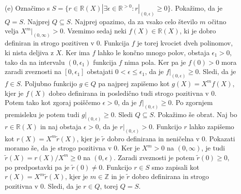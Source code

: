 \documentclass[a4paper, 12pt]{article}
\newcommand{\Z}{\mathbb{Z}}
\newcommand{\R}{\mathbb{R}}
\begin{document}
\begin{enumerate}
%
%
%
%
%


\item[(e)] Označimo s $S= \{r\in \R(X)| \exists \epsilon  \in \R^{>0} : r|_{(0,\epsilon)} \ge 0\}$. Pokažimo, da je $Q=S$. Najprej $Q\subseteq S$. Najprej opazimo, da za vsako celo število $m$ očitno velja $X^m|_{(0,\infty)}>0$. Vzemimo sedaj neki $f(X)\in \R(X)$, ki je dobro definiran in strogo pozitiven v 0. Funkcija $f$ je torej kvociet dveh polinomov, ki nista deljiva z $X$. Ker ima $f$ lahko le končno mnogo polov, obstaja $\epsilon_1>0$, tako da na intervalu $(0,\epsilon_1)$ funkcija $f$ nima pola. Ker pa je $f(0)>0$ mora zaradi zveznosti na $[0,\epsilon_1]$ obstajati $0<\epsilon\le \epsilon_1$, da je $f|_{(0,\epsilon)}\ge 0$. Sledi, da je $f\in S$. Poljubno funkcijo $g\in  Q$ pa najprej zapišemo kot $g(X) = X^m f(X)$, kjer je $f(X)$ dobro definirana in posledično tudi strogo pozitivna v 0. Potem tako kot zgoraj poiščemo $\epsilon >0$, da je $f|_{(0,\epsilon)}\ge 0$. Po zgornjem premisleku je potem tudi $g|_{(0,\epsilon)}\ge 0$. Sledi $Q\subseteq S$. 
Pokažimo še obrat. Naj bo $r\in \R(X)$ in naj obstaja $\epsilon >0$, da je $r|_{(0,\epsilon)}>0$. Funkcijo $r$ lahko zapišemo kot $r(X) = X^m \tilde{r}(X)$, kjer je $\tilde{r}$ dobro definirana in neničelna v 0. Pokazati moramo še, da je strogo pozitivna v 0. Ker je $X^m>0$ na $(0,\infty)$, je tudi $\tilde{r} (X) = r(X) / X^m \ge 0$ na $(0,\epsilon)$. Zaradi zveznosti je potem $\tilde{r}(0) \ge 0$, po predpostavki pa je $\tilde{r}(0) \neq 0$. Funkcijo $r\in S$ smo zapisali kot $r(X) = X^m \tilde{r}(X)$, kjer je $m\in \Z$ in je $\tilde{r}$ dobro definirana in strogo pozitivna v 0. Sledi, da je $r\in Q$, torej $Q=S$.


\end{enumerate}
\end{document}
